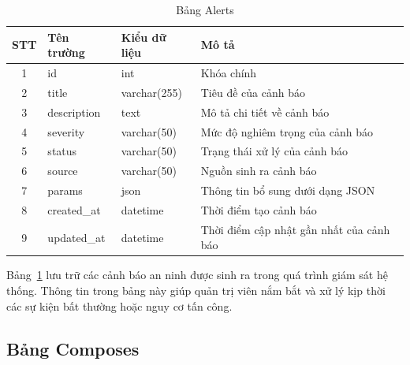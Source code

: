 \documentclass[../DoAn.tex]{subfiles}
\begin{document}
\begin{table}[H]
\centering
\begin{tabular}{|c|l|l|l|}
\hline
\textbf{STT} & \textbf{Tên trường}   & \textbf{Kiểu dữ liệu} & \textbf{Mô tả}                              \\ \hline
1            & id                    & int                  & Khóa chính \\ \hline
2            & title                 & varchar(255)         & Tiêu đề của cảnh báo                        \\ \hline
3            & description           & text                 & Mô tả chi tiết về cảnh báo                  \\ \hline
4            & severity              & varchar(50)          & Mức độ nghiêm trọng của cảnh báo            \\ \hline
5            & status                & varchar(50)          & Trạng thái xử lý của cảnh báo               \\ \hline
6            & source                & varchar(50)          & Nguồn sinh ra cảnh báo                      \\ \hline
7            & params                & json                 & Thông tin bổ sung dưới dạng JSON            \\ \hline
8            & created\_at           & datetime             & Thời điểm tạo cảnh báo                      \\ \hline
9           & updated\_at           & datetime             & Thời điểm cập nhật gần nhất của cảnh báo    \\ \hline
\end{tabular}
\caption{Bảng Alerts}
\label{tab:alerts}
\end{table}

Bảng~\ref{tab:alerts} lưu trữ các cảnh báo an ninh được sinh ra trong quá trình giám sát hệ thống. Thông tin trong bảng này giúp quản trị viên nắm bắt và xử lý kịp thời các sự kiện bất thường hoặc nguy cơ tấn công.

\subsection{Bảng Composes}
\end{document}
